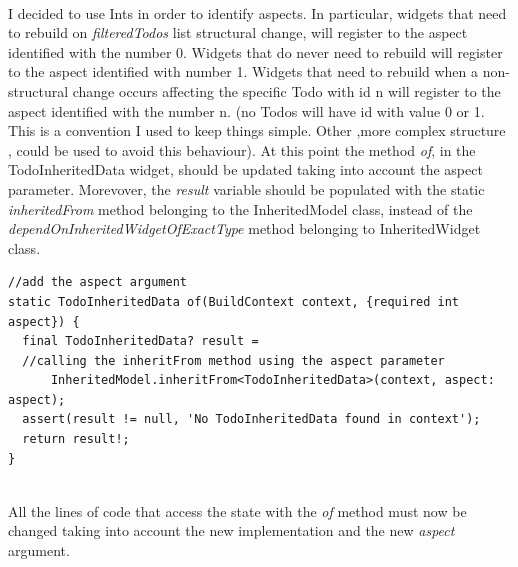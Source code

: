 \mbox{}\\
I decided to use Ints in order to identify aspects. In particular, widgets that need to rebuild on \textit{filteredTodos} list structural change, will register to the aspect identified with the number 0. Widgets that do never need to rebuild will register to the aspect identified with number 1. Widgets that need to rebuild when a non-structural change occurs affecting the specific Todo with id n  will register to the aspect identified with the number n. (no Todos will have id with value 0 or 1. This is a convention I used to keep things simple. Other ,more complex structure , could be used to avoid this behaviour). 
At this point the method \textit{of}, in the TodoInheritedData widget, should be updated taking into account the aspect parameter. Morevover, the \textit{result} variable should be populated with the static \textit{inheritedFrom  } method belonging to the InheritedModel class, instead of the \textit{dependOnInheritedWidgetOfExactType} method belonging to InheritedWidget class.
\mbox{}\\
\begin{code}
\mbox{}
\label{code:2.45}
\begin{verbatim}
//add the aspect argument
static TodoInheritedData of(BuildContext context, {required int aspect}) {
  final TodoInheritedData? result =
  //calling the inheritFrom method using the aspect parameter
      InheritedModel.inheritFrom<TodoInheritedData>(context, aspect: aspect);
  assert(result != null, 'No TodoInheritedData found in context');
  return result!;
}
\end{verbatim}
\end{code}
\mbox{}\\
All the lines of code that access the state with the \textit{of} method must now be changed taking into account the new implementation and the new \textit{aspect} argument.
\mbox{}\\

